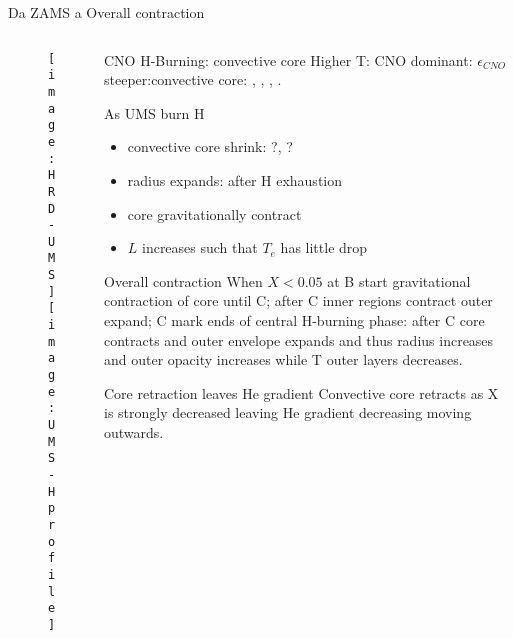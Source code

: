 \begin{frame}{Da ZAMS a Overall contraction}
\begin{columns}[T]\begin{column}{0.5\textwidth}
\begin{figure}[!ht]\texttt{[image: HRD-UMS]}\label{fig:HRD-UMS}
\texttt{[image: UMS-Hprofile]}\label{fig:UMS-Hprofile}\end{figure}
\end{column}\begin{column}{0.5\textwidth}
\begin{block}{CNO H-Burning: convective core}
Higher T: CNO dominant: $\epsilon_{CNO}$ steeper:convective core: , , , \xdiminuisce{\nad{}}.
\end{block}
\begin{block}{As UMS burn H}
\begin{itemize}
    \item convective core shrink: ?\xaumenta{\mu}, ?
    \item radius expands: after H exhaustion
    \item core gravitationally contract
    \item $L$ increases such that $T_e$ has little drop
\end{itemize}
\end{block}
\begin{block}{Overall contraction}
    When $X<0.05$ at B start gravitational contraction of core until C; after C inner regions contract outer expand; C mark ends of central H-burning phase: after C core contracts and outer envelope expands and thus radius increases and outer opacity increases while T outer layers decreases.
\end{block}
\begin{block}{Core retraction leaves He gradient}
    Convective core retracts as X is strongly decreased leaving He gradient decreasing moving outwards.
\end{block}
\end{column}\end{columns}
\end{frame}

